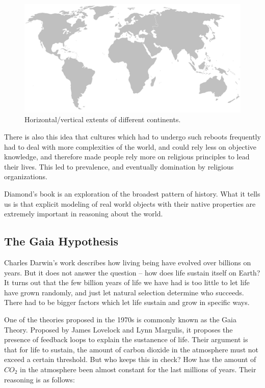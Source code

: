 \begin{figure}[t]
\centering
\includegraphics[width=\textwidth]{media/chapter2/continents.png}
\caption{Horizontal/vertical extents of different continents.}
\label{fig:continental-axis}
\end{figure}

There is also this idea that cultures which had to undergo such reboots frequently had to deal with more complexities of the world, and could rely less on objective knowledge, and therefore made people rely more on religious principles to lead their lives. This led to prevalence, and eventually domination by religious organizations.



Diamond's book is an exploration of the broadest pattern of history. What it tells us is that explicit modeling of real world objects with their native properties are extremely important in reasoning about the world.

\subsection{The Gaia Hypothesis}
Charles Darwin's work describes how living being have evolved over billions on years. But it does not answer the question -- how does life sustain itself on Earth? It turns out that the few billion years of life we have had is too little to let life have grown randomly, and just let natural selection determine who succeeds. There had to be bigger factors which let life sustain and grow in specific ways.

One of the theories proposed in the 1970s is commonly known as the Gaia Theory. Proposed by James Lovelock and Lynn Margulis, it proposes the presence of feedback loops to explain the sustanence of life. Their argument is that for life to sustain, the amount of carbon dioxide in the atmosphere must not exceed a certain threshold. But who keeps this in check? How has the amount of $CO_2$ in the atmosphere been almost constant for the last millions of years. Their reasoning is as follows:

